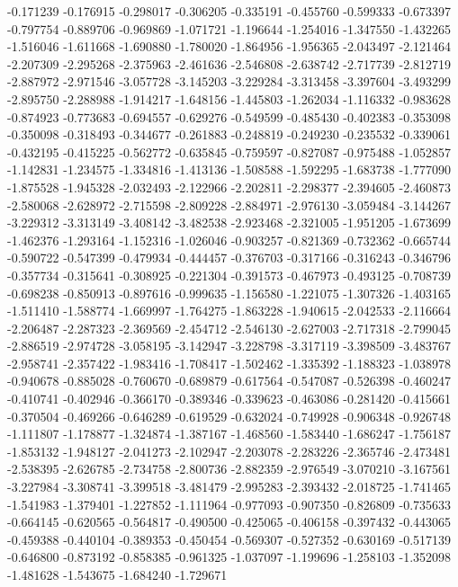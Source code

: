 -0.171239
-0.176915
-0.298017
-0.306205
-0.335191
-0.455760
-0.599333
-0.673397
-0.797754
-0.889706
-0.969869
-1.071721
-1.196644
-1.254016
-1.347550
-1.432265
-1.516046
-1.611668
-1.690880
-1.780020
-1.864956
-1.956365
-2.043497
-2.121464
-2.207309
-2.295268
-2.375963
-2.461636
-2.546808
-2.638742
-2.717739
-2.812719
-2.887972
-2.971546
-3.057728
-3.145203
-3.229284
-3.313458
-3.397604
-3.493299
-2.895750
-2.288988
-1.914217
-1.648156
-1.445803
-1.262034
-1.116332
-0.983628
-0.874923
-0.773683
-0.694557
-0.629276
-0.549599
-0.485430
-0.402383
-0.353098
-0.350098
-0.318493
-0.344677
-0.261883
-0.248819
-0.249230
-0.235532
-0.339061
-0.432195
-0.415225
-0.562772
-0.635845
-0.759597
-0.827087
-0.975488
-1.052857
-1.142831
-1.234575
-1.334816
-1.413136
-1.508588
-1.592295
-1.683738
-1.777090
-1.875528
-1.945328
-2.032493
-2.122966
-2.202811
-2.298377
-2.394605
-2.460873
-2.580068
-2.628972
-2.715598
-2.809228
-2.884971
-2.976130
-3.059484
-3.144267
-3.229312
-3.313149
-3.408142
-3.482538
-2.923468
-2.321005
-1.951205
-1.673699
-1.462376
-1.293164
-1.152316
-1.026046
-0.903257
-0.821369
-0.732362
-0.665744
-0.590722
-0.547399
-0.479934
-0.444457
-0.376703
-0.317166
-0.316243
-0.346796
-0.357734
-0.315641
-0.308925
-0.221304
-0.391573
-0.467973
-0.493125
-0.708739
-0.698238
-0.850913
-0.897616
-0.999635
-1.156580
-1.221075
-1.307326
-1.403165
-1.511410
-1.588774
-1.669997
-1.764275
-1.863228
-1.940615
-2.042533
-2.116664
-2.206487
-2.287323
-2.369569
-2.454712
-2.546130
-2.627003
-2.717318
-2.799045
-2.886519
-2.974728
-3.058195
-3.142947
-3.228798
-3.317119
-3.398509
-3.483767
-2.958741
-2.357422
-1.983416
-1.708417
-1.502462
-1.335392
-1.188323
-1.038978
-0.940678
-0.885028
-0.760670
-0.689879
-0.617564
-0.547087
-0.526398
-0.460247
-0.410741
-0.402946
-0.366170
-0.389346
-0.339623
-0.463086
-0.281420
-0.415661
-0.370504
-0.469266
-0.646289
-0.619529
-0.632024
-0.749928
-0.906348
-0.926748
-1.111807
-1.178877
-1.324874
-1.387167
-1.468560
-1.583440
-1.686247
-1.756187
-1.853132
-1.948127
-2.041273
-2.102947
-2.203078
-2.283226
-2.365746
-2.473481
-2.538395
-2.626785
-2.734758
-2.800736
-2.882359
-2.976549
-3.070210
-3.167561
-3.227984
-3.308741
-3.399518
-3.481479
-2.995283
-2.393432
-2.018725
-1.741465
-1.541983
-1.379401
-1.227852
-1.111964
-0.977093
-0.907350
-0.826809
-0.735633
-0.664145
-0.620565
-0.564817
-0.490500
-0.425065
-0.406158
-0.397432
-0.443065
-0.459388
-0.440104
-0.389353
-0.450454
-0.569307
-0.527352
-0.630169
-0.517139
-0.646800
-0.873192
-0.858385
-0.961325
-1.037097
-1.199696
-1.258103
-1.352098
-1.481628
-1.543675
-1.684240
-1.729671
